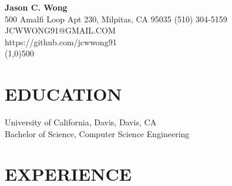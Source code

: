 \documentclass{res}
\begin{document}
 

{\centering
	\Large{\bf Jason C. Wong} \\
	\normalsize
	500 Amalfi Loop Apt 230, Milpitas, CA 95035 \hspace{1pt} \textbullet \hspace{1pt}
	(510) 304-5159 
	\hspace{1pt} \textbullet \hspace{1pt} JCWWONG91@GMAIL.COM \\
	https://github.com/jcwwong91 \\
	\footnotesize
	\line(1,0){500} \\
}

\normalsize
\begin{resume}

\vspace{-15pt}
\section{EDUCATION}          
    University of California, Davis, Davis, CA  \\        
    Bachelor of Science, Computer Science Engineering  

\vspace{-10pt}
\section{EXPERIENCE}
   \vspace{-0.1in}	
   

\end{resume}
\end{document}

